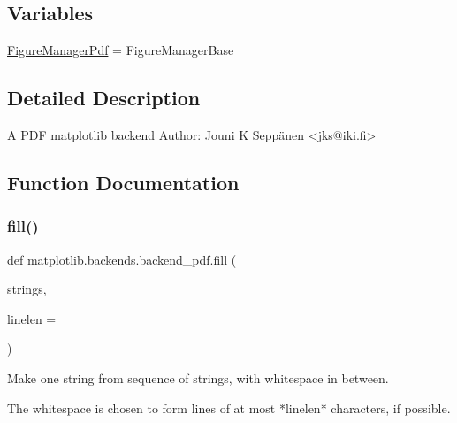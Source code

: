 \subsection*{Variables}
\begin{DoxyCompactItemize}
\item 
\hyperlink{namespacematplotlib_1_1backends_1_1backend__pdf_ab2cf0ff913055133077011d5129ff6ab}{Figure\+Manager\+Pdf} = Figure\+Manager\+Base
\end{DoxyCompactItemize}


\subsection{Detailed Description}
\begin{DoxyVerb}A PDF matplotlib backend
Author: Jouni K Seppänen <jks@iki.fi>
\end{DoxyVerb}
 

\subsection{Function Documentation}
\mbox{\label{namespacematplotlib_1_1backends_1_1backend__pdf_a621a4549ad3b8bd5c759541aa1739fa4}} 
\subsubsection{\texorpdfstring{fill()}{fill()}}
{\footnotesize\ttfamily def matplotlib.\+backends.\+backend\+\_\+pdf.\+fill (\begin{DoxyParamCaption}\item[{}]{strings,  }\item[{}]{linelen = {} }\end{DoxyParamCaption})}

\begin{DoxyVerb}Make one string from sequence of strings, with whitespace in between.

The whitespace is chosen to form lines of at most *linelen* characters,
if possible.
\end{DoxyVerb}
 \mbox{\label{namespacematplotlib_1_1backends_1_1backend__pdf_a4c94908a6c63df6232edbc7792e35464}} 

